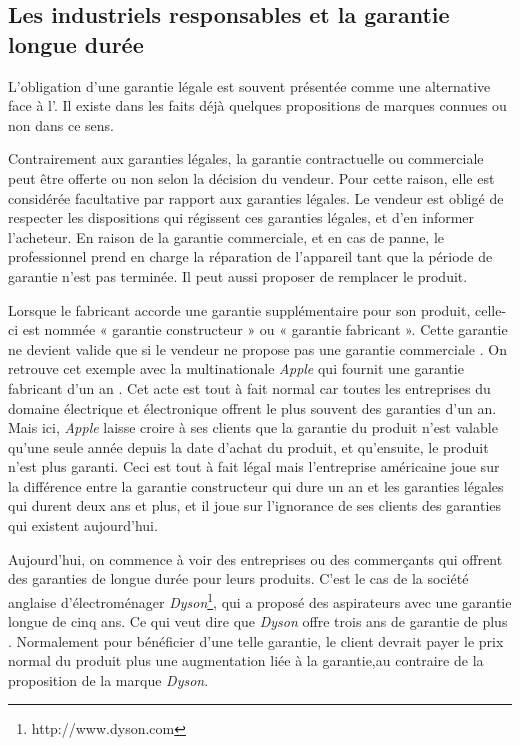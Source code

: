 \subsection{Les industriels responsables et la garantie longue durée}


L'obligation d'une garantie légale est souvent présentée comme une alternative face à l'\op. Il existe dans les faits déjà quelques propositions de marques connues ou non dans ce sens.

\bigbreak
Contrairement aux garanties légales, la garantie contractuelle ou commerciale peut être offerte ou non selon la décision du vendeur. Pour cette raison, elle est considérée facultative par rapport aux garanties légales. Le vendeur est obligé de respecter les dispositions qui régissent ces garanties légales, et d'en informer l'acheteur. 
En raison de la garantie commerciale, et en cas de panne, le professionnel prend en charge la réparation de l'appareil tant que la période de garantie n'est pas terminée. Il peut aussi proposer de remplacer le produit.

\bigbreak
Lorsque le fabricant accorde une garantie supplémentaire pour son produit, celle-ci est nommée « garantie constructeur » ou « garantie fabricant ». Cette garantie ne devient valide que si le vendeur ne propose pas une garantie commerciale \cite{loigarantie}.
On retrouve cet exemple avec la multinationale \textit{Apple} qui fournit une garantie fabricant d'un an \cite{apple}. Cet acte est tout à fait normal car toutes les entreprises du domaine électrique et électronique offrent le plus souvent des garanties d'un an. Mais ici, \textit{Apple} laisse croire à ses clients que la garantie du produit n'est valable qu'une seule année depuis la date d'achat du produit, et qu'ensuite, le produit n'est plus garanti. Ceci est tout à fait légal mais l'entreprise américaine joue sur la différence entre la garantie constructeur qui dure un an et les garanties légales qui durent deux ans et plus, et il joue sur l'ignorance de ses clients des garanties qui existent aujourd'hui.

\bigbreak
Aujourd'hui, on commence à voir des entreprises ou des commerçants qui offrent des garanties de longue durée pour leurs produits. C'est le cas de la société anglaise d'électroménager \textit{Dyson}\footnote{http://www.dyson.com}, qui a proposé des aspirateurs avec une garantie longue de cinq ans. Ce qui veut dire que \textit{Dyson} offre trois ans de garantie de plus \cite{dyson}. Normalement pour bénéficier d'une telle garantie, le client devrait payer le prix normal du produit plus une augmentation liée à la garantie,au contraire de la proposition de la marque \textit{Dyson}.

